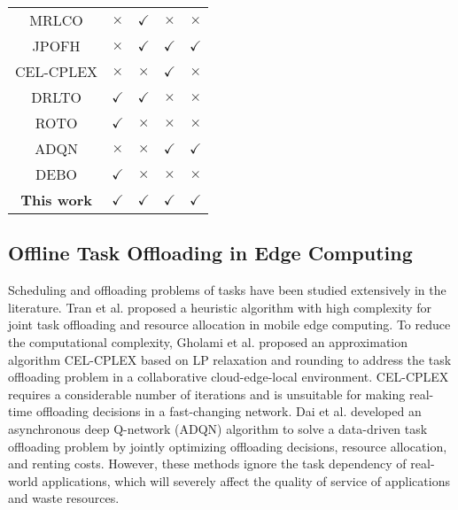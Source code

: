 \documentclass[10pt, conference, letterpaper]{IEEEtran}
\begin{document}
\begin{table}[t]
\begin{tabular}{@{}c@{}cccc@{}}
    MRLCO \cite{wang2020fast} &$\times$&$\checkmark$&$\times$&$\times$ \\
    JPOFH \cite{sahni2020multi} &$\times$&$\checkmark$&$\checkmark$&$\checkmark$\\
    CEL-CPLEX \cite{gholami2021collaborative} & $\times$ & $\times$ & $\checkmark$ & $\times$ \\
    DRLTO \cite{wang2021dependent} &$\checkmark$&$\checkmark$&$\times$&$\times$ \\
    ROTO \cite{ma2021towards} &$\checkmark$&$\times$&$\times$&$\times$ \\
    ADQN \cite{dai2021asynchronous} &$\times$&$\times$&$\checkmark$&$\checkmark$ \\
    DEBO \cite{wang2021decentralized} &$\checkmark$&$\times$&$\times$&$\times$ \\
    \textbf{This work} & $\checkmark$&$\checkmark$&$\checkmark$&$\checkmark$ \\
    \bottomrule
\end{tabular}
\end{table}

\subsection{Offline Task Offloading in Edge Computing}

Scheduling and offloading problems of tasks have been studied extensively in the literature. Tran et al. \cite{tran2018joint} proposed a heuristic algorithm with high complexity for joint task offloading and resource allocation in mobile edge computing. To reduce the computational complexity, Gholami et al. \cite{gholami2021collaborative} proposed an approximation algorithm CEL-CPLEX based on LP relaxation and rounding to address the task offloading problem in a collaborative cloud-edge-local environment. CEL-CPLEX requires a considerable number of iterations and is unsuitable for making real-time offloading decisions in a fast-changing network. Dai et al. \cite{dai2021asynchronous} developed an asynchronous deep Q-network (ADQN) algorithm to solve a data-driven task offloading problem by jointly optimizing offloading decisions, resource allocation, and renting costs. However, these methods ignore the task dependency of real-world applications, which will severely affect the quality of service of applications and waste resources.
\end{document}
